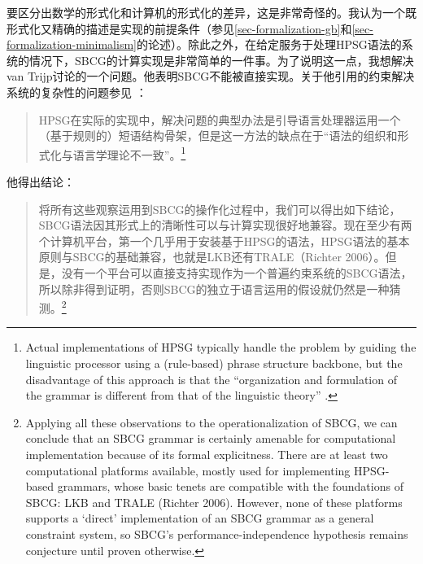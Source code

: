 
要区分出数学的形式化和计算机的形式化的差异，这是非常奇怪的。我认为一个既形式化又精确的描述是实现的前提条件（参见\ref{sec-formalization-gb}和\ref{sec-formalization-minimalism}的论述）。除此之外，在给定服务于处理HPSG语法的系统的情况下，SBCG的计算实现是非常简单的一件事。为了说明这一点，我想解决van Trijp讨论的一个问题。他表明SBCG不能被直接实现。关于他引用的约束解决系统的复杂性的问题参见 \citet[\S~4.2.2]{LM2006a}：
\begin{quotation}
HPSG在实际的实现中，解决问题的典型办法是引导语言处理器运用一个（基于规则的）短语结构骨架，但是这一方法的缺点在于“语法的组织和形式化与语言学理论不一致”\citep[\S~4.2.2]{LM2006a}。\citep[]{vanTrijp2013a}\footnote{%
Actual implementations of HPSG typically handle the problem by guiding the linguistic processor
using a (rule-based) phrase structure backbone, but the disadvantage of this approach is that the ``organization and formulation of the grammar is different from
that of the linguistic theory'' \citep[Section~4.2.2]{LM2006a}.}
\end{quotation}
他得出结论：
\begin{quotation}
将所有这些观察运用到SBCG的操作化过程中，我们可以得出如下结论，SBCG语法因其形式上的清晰性可以与计算实现很好地兼容。现在至少有两个计算机平台，第一个几乎用于安装基于HPSG的语法，HPSG语法的基本原则与SBCG的基础兼容，也就是LKB\citep{Copestake2002a}还有TRALE（Richter 2006）。但是，没有一个平台可以直接支持实现作为一个普遍约束系统的SBCG语法，所以除非得到证明，否则SBCG的独立于语言运用的假设就仍然是一种猜测。\footnote{%
Applying all these observations to the operationalization of SBCG, we can
conclude that an SBCG grammar is certainly amenable for computational implementation because of its formal explicitness. There are at least two computational
platforms available, mostly used for implementing HPSG-based grammars, whose
basic tenets are compatible with the foundations of SBCG: LKB \citep{Copestake2002a}
and TRALE (Richter 2006). However, none of these platforms supports a `direct'
implementation of an SBCG grammar as a general constraint system, so SBCG's
performance-independence hypothesis remains conjecture until proven otherwise.}
\end{quotation}
